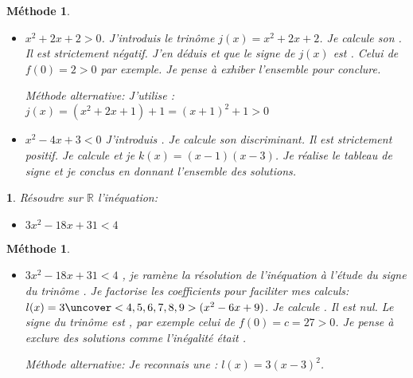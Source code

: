 \documentclass{beamer}
\newtheorem{exercise}[theorem]{\translate{Exercise}}
\newtheorem{methode}[theorem]{{Méthode}}
\begin{document}
  \begin{frame}
  \begin{methode}
    \begin{itemize}
     \item $x^2+2x+2>0$. J'introduis le trinôme $j(x)=x^2+2x+2$. Je calcule son 
     . 
     Il est strictement négatif. J'en déduis 
      et que le signe de
     $j(x)$ est . Celui de $f(0)=2>0$ par exemple. Je pense
     à exhiber l'ensemble 
     pour conclure.
     
     Méthode alternative: J'utilise : 
     $j(x)=(x^2+2x+1)+1=(x+1)^2+1>0$
     \item $x^2-4 x+3<0$ J'introduis . Je calcule son discriminant.
     Il est strictement positif. Je calcule 
     et je 
     $k(x)=(x-1)(x-3)$. Je réalise le tableau de signe et je conclus en donnant
     l'ensemble des solutions.
   \end{itemize}
 \end{methode}
\end{frame}

  \begin{frame}
  \begin{exercise}
    Résoudre sur $\mathbb{R}$ l'inéquation:
    \begin{itemize}
     \item $3x^2-18x+31<4$
   \end{itemize}    
  \end{exercise} 
  \end{frame}

  
  \begin{frame}
  \begin{methode}
    \begin{itemize}
      \item $3x^2-18x+31<4$ , 
      je ramène la résolution de l'inéquation à l'étude 
      du signe du trinôme 
     . Je 
      factorise les coefficients pour faciliter mes calculs: 
      $l(x)=3\uncover<4,5,6,7,8,9>{(x^2-6x+9)}$. Je calcule 
      . Il est nul. 
      Le signe du trinôme est , par exemple 
      celui de $f(0)=c=27>0$. Je pense à 
      exclure  des solutions 
      comme l'inégalité était . 
     
     Méthode alternative: Je reconnais une : $l(x)=3(x-3)^2$.
     
   \end{itemize}    
  \end{methode} 
  \end{frame}
  
\end{document}
